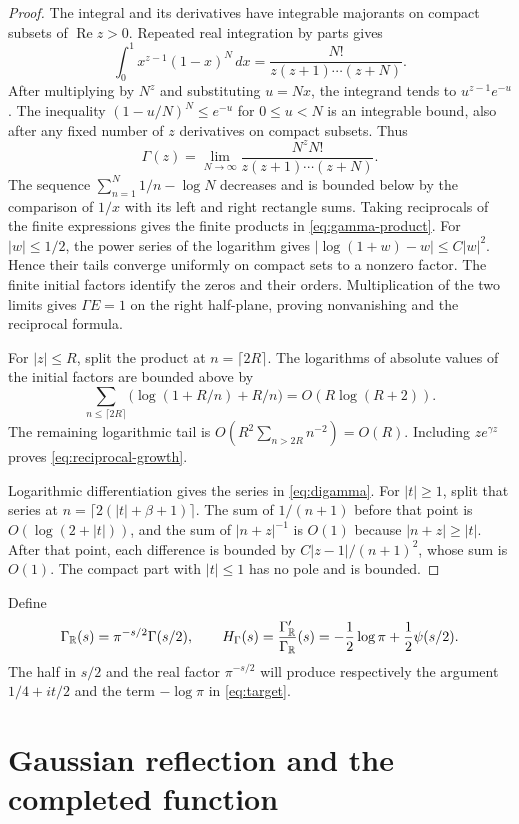 \begin{proof}
The integral and its derivatives have integrable majorants on compact
subsets of $\operatorname{Re}z>0$.
Repeated real integration by parts gives
\[
 \int_0^1 x^{z-1}(1-x)^N\,dx
       =\frac{N!}{z(z+1)\cdots(z+N)}.
\]
After multiplying by $N^z$ and substituting $u=Nx$, the integrand tends to
$u^{z-1}e^{-u}$.  The inequality $(1-u/N)^N\leq e^{-u}$ for $0\leq u<N$
is an integrable bound, also after any fixed number of $z$ derivatives
on compact subsets.  Thus
\[
 \Gamma(z)=\lim_{N\to\infty}
        \frac{N^zN!}{z(z+1)\cdots(z+N)}.
\]
The sequence $\sum_{n=1}^N1/n-\log N$ decreases and is bounded below
by the comparison of $1/x$ with its left and right rectangle sums.
Taking reciprocals of the finite expressions gives the finite products
in \eqref{eq:gamma-product}.
For $|w|\leq1/2$, the power series of the logarithm gives
$|\log(1+w)-w|\leq C|w|^2$.
Hence their tails converge uniformly on compact sets to a nonzero factor.
The finite initial factors identify the zeros and their orders.
Multiplication of the two limits gives $\Gamma E=1$ on the right half-plane,
proving nonvanishing and the reciprocal formula.

For $|z|\leq R$, split the product at $n=\lceil2R\rceil$.
The logarithms of absolute values of the initial factors are bounded above by
\[
 \sum_{n\leq\lceil2R\rceil}
       \bigl(\log(1+R/n)+R/n\bigr)=O(R\log(R+2)).
\]
The remaining logarithmic tail is $O(R^2\sum_{n>2R}n^{-2})=O(R)$.
Including $z e^{\gamma z}$ proves \eqref{eq:reciprocal-growth}.

Logarithmic differentiation gives the series in \eqref{eq:digamma}.
For $|t|\geq1$, split that series at $n=\lceil2(|t|+\beta+1)\rceil$.
The sum of $1/(n+1)$ before that point is $O(\log(2+|t|))$,
and the sum of $|n+z|^{-1}$ is $O(1)$ because $|n+z|\geq|t|$.
After that point, each difference is bounded by $C|z-1|/(n+1)^2$,
whose sum is $O(1)$.
The compact part with $|t|\leq1$ has no pole and is bounded.
\end{proof}

Define
\begin{equation}
 \Gamma_{\mathbb R}(s)=\pi^{-s/2}\Gamma(s/2),\qquad
 H_\Gamma(s)=\frac{\Gamma_{\mathbb R}'}{\Gamma_{\mathbb R}}(s)
          =-\frac12\log\pi+\frac12\psi(s/2).
 \label{eq:gamma-real}
\end{equation}
The half in $s/2$ and the real factor $\pi^{-s/2}$ will produce respectively
the argument $1/4+it/2$ and the term $-\log\pi$ in \eqref{eq:target}.

\section{Gaussian reflection and the completed function}
\label{sec:theta}

